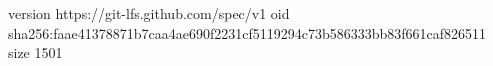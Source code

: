version https://git-lfs.github.com/spec/v1
oid sha256:faae41378871b7caa4ae690f2231cf5119294c73b586333bb83f661caf826511
size 1501

